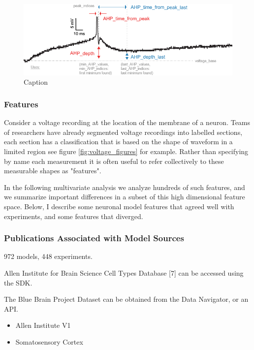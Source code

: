 \begin{figure}
    \centering
    \includegraphics{figures/AHP.png}
    \caption{Caption}
    \label{fig:features_example_ahp}
\end{figure}



\subsubsection{Features} 
Consider a voltage recording at the location of the membrane of a neuron. Teams of researchers have already segmented voltage recordings into labelled sections, each section has a classification that is based on the shape of waveform in a limited region see figure \ref{fig:voltage_figures} for example. Rather than specifying by name each measurement it is often useful to refer collectively to these measurable shapes as "features". 

In the following multivariate analysis we analyze hundreds of such features, and we summarize important differences in a subset of this high dimensional feature space.  Below, I describe some neuronal model features that agreed well with experiments, and some features that diverged.


\subsubsection{Publications Associated with Model Sources}
972 models, 448 experiments.

Allen Institute for Brain Science Cell Types Database [7] can be accessed using the SDK. 

The Blue Brain Project Dataset can be obtained from the Data Navigator, or an API.

\begin{itemize}
\item Allen Institute V1 \cite{gouwens2018systematic}
\item Somatosensory Cortex \cite{markram2015} 
\end{itemize}

